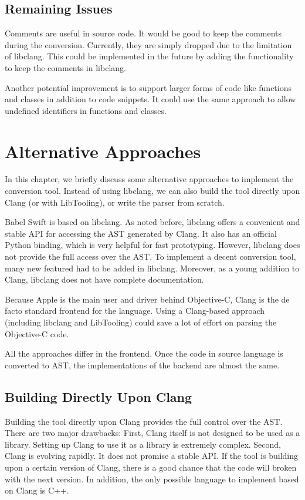\documentclass{sfuthesis}
\begin{document}
\section{Remaining Issues}


Comments are useful in source code. It would be good to keep the comments during the conversion. Currently, they are simply dropped due to the limitation of libclang. This could be implemented in the future by adding the functionality to keep the comments in libclang.

Another potential improvement is to support larger forms of code like functions and classes in addition to code snippets. It could use the same approach to allow undefined identifiers in functions and classes.

\chapter{Alternative Approaches}

In this chapter, we briefly discuss some alternative approaches to implement the conversion tool. Instead of using libclang, we can also build the tool directly upon Clang (or with LibTooling), or write the parser from scratch.

Babel Swift is based on libclang. As noted before, libclang offers a convenient and stable API for accessing the AST generated by Clang. It also has an official Python binding, which is very helpful for fast prototyping. However, libclang does not provide the full access over the AST. To implement a decent conversion tool, many new featured had to be added in libclang. Moreover, as a young addition to Clang, libclang does not have complete documentation.

Because Apple is the main user and driver behind Objective-C, Clang is the de facto standard frontend for the language. Using a Clang-based approach (including libclang and LibTooling) could save a lot of effort on parsing the Objective-C code.

All the approaches differ in the frontend. Once the code in source language is converted to AST, the implementations of the backend are almost the same.

\section{Building Directly Upon Clang}

Building the tool directly upon Clang provides the full control over the AST. There are two major drawbacks: First, Clang itself is not designed to be used as a library. Setting up Clang to use it as a library is extremely complex. Second, Clang is evolving rapidly. It does not promise a stable API. If the tool is building upon a certain version of Clang, there is a good chance that the code will broken with the next version. In addition, the only possible language to implement based on Clang is C++.
\end{document}
